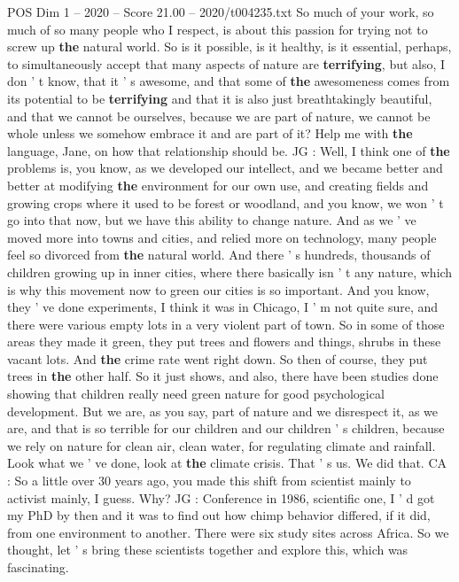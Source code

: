 \begin{textsample}{POS Dim 1 – 2020 – Score 21.00 – 2020/t004235.txt}
So much of your work, so much of so many people who I respect, is about this passion for trying not to screw up \textbf{the} natural world.
So is it possible, is it healthy, is it essential, perhaps, to simultaneously accept that many aspects of nature are \textbf{terrifying}, but also, I don ' t know, that it ' s awesome, and that some of \textbf{the} awesomeness comes from its potential to be \textbf{terrifying} and that it is also just breathtakingly beautiful, and that we cannot be ourselves, because we are part of nature, we cannot be whole unless we somehow embrace it and are part of it?
Help me with \textbf{the} language, Jane, on how that relationship should be.
JG : Well, I think one of \textbf{the} problems is, you know, as we developed our intellect, and we became better and better at modifying \textbf{the} environment for our own use, and creating fields and growing crops where it used to be forest or woodland, and you know, we won ' t go into that now, but we have this ability to change nature.
And as we ' ve moved more into towns and cities, and relied more on technology, many people feel so divorced from \textbf{the} natural world.
And there ' s hundreds, thousands of children growing up in inner cities, where there basically isn ' t any nature, which is why this movement now to green our cities is so important.
And you know, they ' ve done experiments, I think it was in Chicago, I ' m not quite sure, and there were various empty lots in a very violent part of town.
So in some of those areas they made it green, they put trees and flowers and things, shrubs in these vacant lots.
And \textbf{the} crime rate went right down.
So then of course, they put trees in \textbf{the} other half.
So it just shows, and also, there have been studies done showing that children really need green nature for good psychological development.
But we are, as you say, part of nature and we disrespect it, as we are, and that is so terrible for our children and our children ' s children, because we rely on nature for clean air, clean water, for regulating climate and rainfall.
Look what we ' ve done, look at \textbf{the} climate crisis.
That ' s us.
We did that.
CA : So a little over 30 years ago, you made this shift from scientist mainly to activist mainly, I guess.
Why?
JG : Conference in 1986, scientific one, I ' d got my PhD by then and it was to find out how chimp behavior differed, if it did, from one environment to another.
There were six study sites across Africa.
So we thought, let ' s bring these scientists together and explore this, which was fascinating.

\end{textsample}
